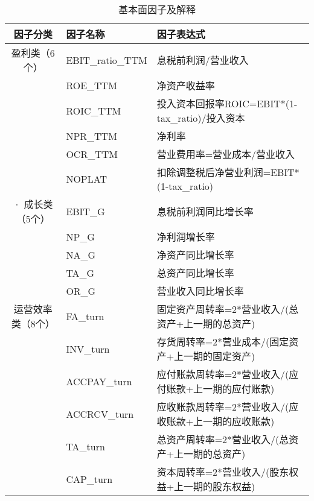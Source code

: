 \documentclass[11pt]{article}
\begin{document}
\begin{xltabular}{\textwidth}{clX}
  \caption{基本面因子及解释}
  \label{tab:explain}\\
\toprule
因子分类      & 因子名称              & 因子表达式                                            \\ \hline
盈利类（6个）   & EBIT\_ratio\_TTM  & 息税前利润/营业收入                                       \\
        & ROE\_TTM          & 净资产收益率                                           \\
        & ROIC\_TTM         & 投入资本回报率ROIC=EBIT*(1-tax\_ratio)/投入资本             \\
        & NPR\_TTM          & 净利率                                              \\
        & OCR\_TTM          & 营业费用率=营业成本/营业收入                                  \\
        & NOPLAT            & 扣除调整税后净营业利润=EBIT*(1-tax\_ratio)                  \\  ·
成长类（5个）   & EBIT\_G           & 息税前利润同比增长率                                       \\
        & NP\_G             & 净利润增长率                                           \\
        & NA\_G             & 净资产同比增长率                                         \\
        & TA\_G             & 总资产同比增长率                                         \\
        & OR\_G             & 营业收入同比增长率                                        \\  
运营效率类（8个） & FA\_turn          & 固定资产周转率=2*营业收入/(总资产+上一期的总资产)                     \\
        & INV\_turn         & 存货周转率=2*营业成本/(固定资产+上一期的固定资产)                     \\
        & ACCPAY\_turn      & 应付账款周转率=2*营业收入/(应付账款+上一期的应付账款)                   \\
        & ACCRCV\_turn      & 应收账款周转率=2*营业收入/(应收账款+上一期的应收账款)                   \\
        & TA\_turn          & 总资产周转率=2*营业收入/(总资产+上一期的总资产)                      \\
        & CAP\_turn         & 资本周转率=2*营业收入/(股东权益+上一期的股东权益)                     \\

\end{xltabular}
\end{document}
